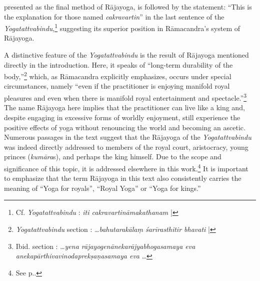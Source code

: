 presented as the final method of Rājayoga, is followed by the statement: ``This is the explanation for those named \textit{cakravartin}'' in the last sentence of the \textit{Yogatattvabindu},\footnote{Cf. \emph{Yogatattvabindu} : \textit{iti cakravartināmakathanam} |} suggesting its superior position in Rāmacandra's system of Rājayoga.

A distinctive feature of the \emph{Yogatattvabindu} is the result of Rājayoga mentioned directly in the introduction. Here, it speaks of ``long-term durability of the body,''\footnote{\emph{Yogatattvabindu} section : \ldots \textit{bahutarakālaṃ śarīrasthitir bhavati} |} which, as Rāmacandra explicitly emphasizes, occurs under special circumstances, namely ``even if the practitioner is enjoying manifold royal pleasures and even when there is manifold royal entertainment and spectacle.''\footnote{Ibid. section : \ldots \textit{yena rājayogenānekarājyabhogasamaya eva anekapārthivavinodaprekṣaṇasamaya eva} \ldots} The name Rājayoga here implies that the practitioner can live like a king and, despite engaging in excessive forms of worldly enjoyment, still experience the positive effects of yoga without renouncing the world and becoming an ascetic. Numerous passages in the text suggest that the Rājayoga of the \textit{Yogatattvabindu} was indeed directly addressed to members of the royal court, aristocracy, young princes (\textit{kumāra}s), and perhaps the king himself. Due to the scope and significance of this topic, it is addressed elsewhere in this work.\footnote{See p.\pageref{ytb-audiencee}.} It is important to emphasize that the term Rājayoga in this text also consistently carries the meaning of ``Yoga for royals'', ``Royal Yoga'' or ``Yoga for kings.''

